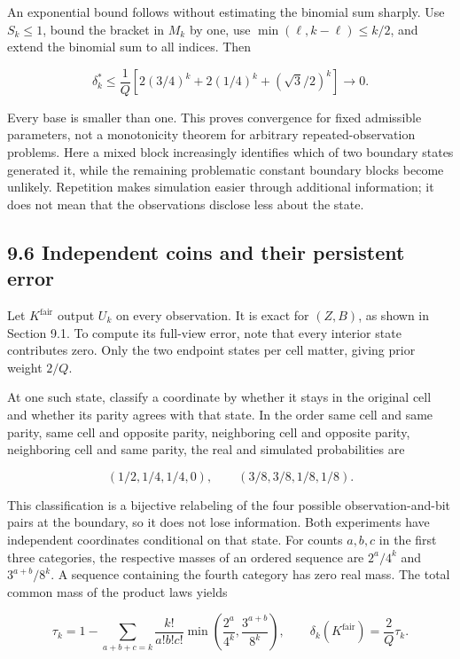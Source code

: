 \documentclass[
]{article}
\begin{document}
An exponential bound follows without estimating the binomial sum
sharply. Use \(S_k\le1\), bound the bracket in \(M_k\) by one, use
\(\min(\ell,k-\ell)\le k/2\), and extend the binomial sum to all
indices. Then

\[
\delta_k^*\le\frac1Q\left[
2(3/4)^k+2(1/4)^k+(\sqrt3/2)^k\right]
\longrightarrow0.
\]

Every base is smaller than one. This proves convergence for fixed
admissible parameters, not a monotonicity theorem for arbitrary
repeated-observation problems. Here a mixed block increasingly
identifies which of two boundary states generated it, while the
remaining problematic constant boundary blocks become unlikely.
Repetition makes simulation easier through additional information; it
does not mean that the observations disclose less about the state.

\subsection{9.6 Independent coins and their persistent
error}\label{independent-coins-and-their-persistent-error}

Let \(K^{\mathrm{fair}}\) output \(U_k\) on every observation. It is
exact for \((Z,B)\), as shown in Section 9.1. To compute its full-view
error, note that every interior state contributes zero. Only the two
endpoint states per cell matter, giving prior weight \(2/Q\).

At one such state, classify a coordinate by whether it stays in the
original cell and whether its parity agrees with that state. In the
order same cell and same parity, same cell and opposite parity,
neighboring cell and opposite parity, neighboring cell and same parity,
the real and simulated probabilities are

\[
(1/2,1/4,1/4,0),\qquad
(3/8,3/8,1/8,1/8).
\]

This classification is a bijective relabeling of the four possible
observation-and-bit pairs at the boundary, so it does not lose
information. Both experiments have independent coordinates conditional
on that state. For counts \(a,b,c\) in the first three categories, the
respective masses of an ordered sequence are \(2^a/4^k\) and
\(3^{a+b}/8^k\). A sequence containing the fourth category has zero real
mass. The total common mass of the product laws yields

\[
\tau_k=1-\sum_{a+b+c=k}\frac{k!}{a!b!c!}
\min\left(\frac{2^a}{4^k},\frac{3^{a+b}}{8^k}\right),
\qquad
\delta_k(K^{\mathrm{fair}})=\frac2Q\tau_k.
\]
\end{document}
